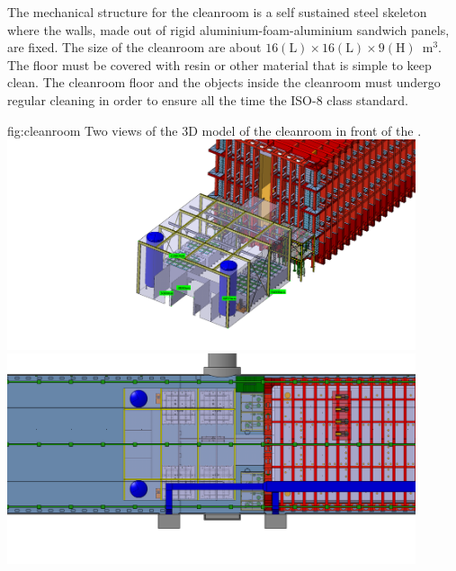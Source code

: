 The mechanical structure for the cleanroom is a self sustained steel skeleton where the walls, made out of rigid aluminium-foam-aluminium sandwich panels, are fixed.
The size of the cleanroom are about $16 \mathrm{(L)} \times 16 \mathrm{(L)} \times 9 \mathrm{(H)}$~m$^3$.
The floor must be covered with resin or other material that is simple to keep clean.
The cleanroom floor and the objects inside the cleanroom must undergo regular cleaning in order to ensure all the time the ISO-8 class standard.

\begin{dunefigure}{fig:cleanroom}
{Two views of the 3D model of the cleanroom in front of the .}
\includegraphics[width=0.9\textwidth]{graphics/cleanroom1.png}
\includegraphics[width=0.9\textwidth]{graphics/cleanroom2.png}
\end{dunefigure}

